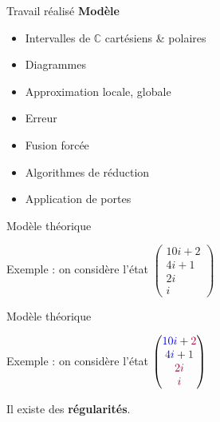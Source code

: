 \begin{frame}{Travail réalisé}
  \textbf{Modèle}
  \begin{itemize}
      \item[\checkmark] Intervalles de $\mathbb C$ cartésiens \& polaires
      \item[\checkmark] Diagrammes
      \item[\checkmark] Approximation locale, globale
      \item[\checkmark] Erreur
      \item[\checkmark] Fusion forcée
      \item[\checkmark] Algorithmes de réduction
      \item[\checkmark] Application de portes
  \end{itemize}
\end{frame}

\begin{frame}{Modèle théorique}

  Exemple : on considère l'état $\begin{pmatrix}
    10i+2 \\ 4i+1 \\ 2i \\ i
  \end{pmatrix}$

  \vspace{2em}

\end{frame}

\begin{frame}[noframenumbering]{Modèle théorique} %

  Exemple : on considère l'état $\begin{pmatrix}
  \color{blue}10i \color{black} + \color{cs} 2 \\
  \color{blue}4i  \color{black} + \color{cs} 1 \\
  \color{cs}  2i \\
  \color{cs}  i
  \end{pmatrix}$

  \vspace{1em}
  Il existe des \textbf{régularités}.
\end{frame}

